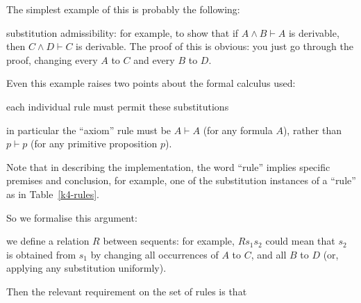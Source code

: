 \documentclass[a4paper,12pt]{llncs}
\newcommand\comment[1]{}
\renewcommand\comment[1]{#1} %
\renewcommand\comment[1]{} %
\begin{document}
\comment{
NB - it seems I did something pretty similar in Isabelle,
I think not written up, unless it's in the stuff we did with Jesse,
in ~jeremy/isabelle/2005/seqms/ctr.thy
see the definition of \verb|inv_stepm| as follows 

\begin{verbatim}
primrec
  (* step in invertibility ; means that, if premises (ps) derivable,
    and can apply (invs_of irls) to premises,
    then can apply (invs_of irls) to conclusion (concl) *)
  "inv_step derivs irls (ps, concl) = (set ps <= derivs -->
    (ALL p : set ps. invs_of irls p <= derivs) -->
    invs_of irls concl <= derivs)"

primrec
  (* variation on inv_step which will often be true and monotonic,
    whereby the inversions of the conclusion are derivable from the
    inversions of the premises *)
  "inv_stepm drls irls (ps, concl) = (invs_of irls concl <=
    derrec drls (set ps Un UNION (set ps) (invs_of irls)))"
\end{verbatim}

(here, \verb|invs_of irls| means the result of changing a sequent
by inverting some rule in irls)
}

The simplest example of this is probably the following:

substitution admissibility: for example, to show that if
$A \land B \vdash A$ is derivable, then $C \land D \vdash C$ is derivable.
The proof of this is obvious: you just go through the proof, changing
every $A$ to $C$ and every $B$ to $D$.

Even this example raises two points about the formal calculus used:

each individual rule must permit these substitutions

in particular the ``axiom'' rule must be $A \vdash A$ (for any formula $A$),
rather than $p \vdash p$ (for any primitive proposition $p$).

Note that in describing the implementation, the word ``rule'' implies
specific premises and conclusion, for example, one of the substitution
instances of a ``rule'' as in Table~\ref{k4-rules}.

So we formalise this argument:

we define a relation $R$ between sequents:
for example, $R s_1 s_2$ could mean that $s_2$ is obtained from 
$s_1$ by changing all occurrences of $A$ to $C$, and all $B$ to $D$
(or, applying any substitution uniformly).

Then the relevant requirement on the set of rules is that 
\end{document}
